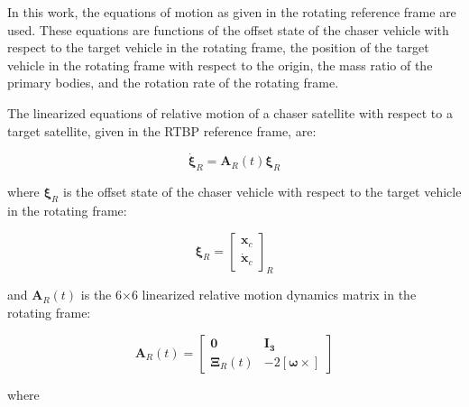 \documentclass[letterpaper, preprint, paper,11pt]{AAS}	%
\begin{document}
In this work, the equations of motion as given in the rotating reference frame are used. These equations are functions of the offset state of the chaser vehicle with respect to the target vehicle in the rotating frame, the position of the target vehicle in the rotating frame with respect to the origin, the mass ratio of the primary bodies, and the rotation rate of the rotating frame.


The linearized equations of relative motion of a chaser satellite with respect to a target satellite, given in the RTBP reference frame, are:

\begin{equation} \label{eq:RelmoDerivs}
	\dot{\boldsymbol{\xi}}_R = \mathbf{A}_R(t)\boldsymbol{\xi}_R
\end{equation}

where \(\boldsymbol{\xi}_R\) is the offset state of the chaser vehicle with respect to the target vehicle in the rotating frame:

\begin{equation*}  %
	\boldsymbol{\xi}_R = \begin{bmatrix}
		\mathbf{x}_c \\
		\dot{\mathbf{x}}_c
	\end{bmatrix}_R
\end{equation*}

and  \(\mathbf{A}_R(t)\) is the 6\(\times\)6 linearized relative motion dynamics matrix in the rotating frame: %

\begin{equation} \label{eq:RelmoDynMatrix}
	\mathbf{A}_R(t) = \begin{bmatrix}
		\mathbf{0}          & \mathbf{I_3} \\
		\mathbf{\Xi}_R(t) & -2 [\boldsymbol{\omega} \times]
	\end{bmatrix}
\end{equation}

where
\end{document}
